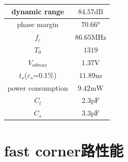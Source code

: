\documentclass[a4paper]{article}
\newcommand{\uV}{\si{\volt}}
\newcommand{\upF}{\si{\pico\farad}}
\newcommand{\uns}{\si{\nano\second}}
\newcommand{\umW}{\si{\milli\watt}}
\newcommand{\uMHz}{\si{\mega\hertz}}
\newcommand{\udB}{\si{\deci\bel}}
\newcommand{\udeg}{\si{\degree}}
\begin{document}
\begin{table}[htbp]
    \begin{tabular}{|c|c|}
        \hline
        dynamic range&$84.57\udB$
        \\\hline
        phase margin&$70.66\udeg$
        \\\hline
        $f_c$ &$86.65\uMHz$
        \\\hline 
        $T_0$&$1319$
        \\\hline
        $V_{odmax}$&$1.37\uV$
        \\\hline
        $t_s$($\varepsilon_s$=0.1\%)&$11.89\uns$
        \\\hline
        power consumption&$9.42\umW$
        \\\hline
        $C_l$&$2.3\upF$
        \\\hline
        $C_s$&$3.3\upF$
        \\\hline
    \end{tabular}
\end{table}
\newpage
\clearpage

\section{fast corner路性能}
\end{document}
